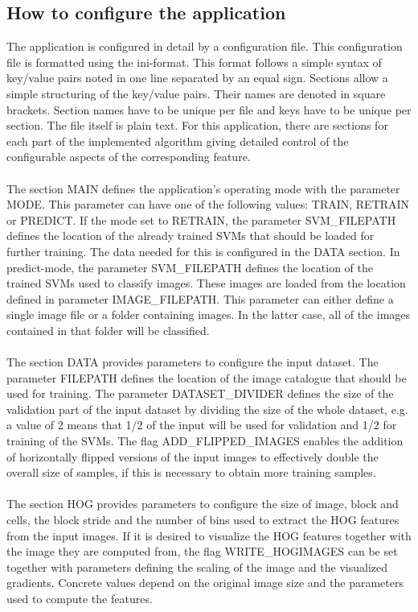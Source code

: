 \subsection{How to configure the application}
The application is configured in detail by a configuration file. This configuration file is formatted using the ini-format. This format follows a simple syntax of key/value pairs noted in one line separated by an equal sign. Sections allow a simple structuring of the key/value pairs. Their names are denoted in square brackets. Section names have to be unique per file and keys have to be unique per section. The file itself is plain text. For this application, there are sections for each part of the implemented algorithm giving detailed control of the configurable aspects of the corresponding feature.
\\
\\
The section MAIN defines the application's operating mode with the parameter MODE. This parameter can have one of the following values: TRAIN, RETRAIN or PREDICT. If the mode set to RETRAIN, the parameter SVM\_FILEPATH defines the location of the already trained SVMs that should be loaded for further training. The data needed for this is configured in the DATA section. In predict-mode, the parameter SVM\_FILEPATH defines the location of the trained SVMs used to classify images. These images are loaded from the location defined in parameter IMAGE\_FILEPATH. This parameter can either define a single image file or a folder containing images. In the latter case, all of the images contained in that folder will be classified.
\\
\\
The section DATA provides parameters to configure the input dataset. The parameter FILEPATH defines the location of the image catalogue that should be used for training. The parameter DATASET\_DIVIDER defines the size of the validation part of the input dataset by dividing the size of the whole dataset, e.g. a value of 2 means that 1/2 of the input will be used for validation and 1/2 for training of the SVMs. The flag ADD\_FLIPPED\_IMAGES enables the addition of horizontally flipped versions of the input images to effectively double the overall size of samples, if this is necessary to obtain more training samples.
\\
\\
The section HOG provides parameters to configure the size of image, block and cells, the block stride and the number of bins used to extract the HOG features from the input images. If it is desired to visualize the HOG features together with the image they are computed from, the flag WRITE\_HOGIMAGES can be set together with parameters defining the scaling of the image and the visualized gradients. Concrete values depend on the original image size and the parameters used to compute the features.
